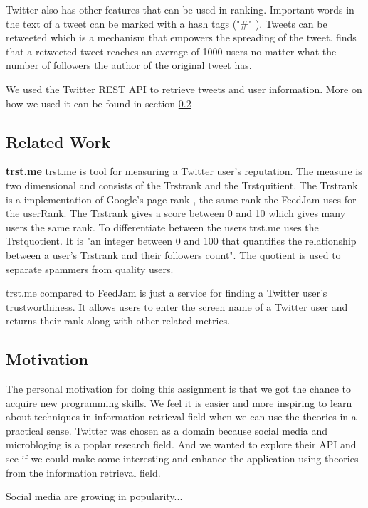 Twitter also has other features that can be used in ranking. Important words in the text of a tweet can be marked with a hash tags ("\#" ). Tweets can be retweeted which is a mechanism that empowers the spreading of the tweet. \citep{Kwak2010} finds that a retweeted tweet reaches an average of 1000 users no matter what the number of followers the author of the original tweet has. 

We used the Twitter REST API to retrieve tweets and user information. More on how we used it can be found in section \ref{} \nameref{} 




\subsection{Related Work}
{\bf trst.me} \newline
trst.me \citet{Infochimps2012b} is tool for measuring a Twitter user's reputation. The measure is two dimensional and consists of the Trstrank and the Trstquitient. The Trstrank is a implementation of Google's page rank \citep{Infochimps2012a}, the same rank the FeedJam uses for the userRank. The Trstrank gives a score between 0 and 10 which gives many users the same rank. To differentiate between the users trst.me uses the Trstquotient. It is "an integer between 0 and 100 that quantifies the relationship between a user's Trstrank and their followers count"\citep{Infochimps2012}. The quotient is used to separate spammers from quality users. 

trst.me compared to FeedJam is just a service for finding a Twitter user's trustworthiness. It allows users to enter the screen name of a Twitter user and returns their rank along with other related metrics.  

\subsection{Motivation} %
The personal motivation for doing this assignment is that we got the chance to acquire new programming skills. We feel it is easier and more inspiring to learn about techniques in information retrieval field when we can use the theories in a practical sense. Twitter was chosen as a domain because social media and microbloging is a poplar research field. And we wanted to explore their API and see if we could make some interesting and enhance the application using theories from the information retrieval field. 

Social media are growing in popularity...

